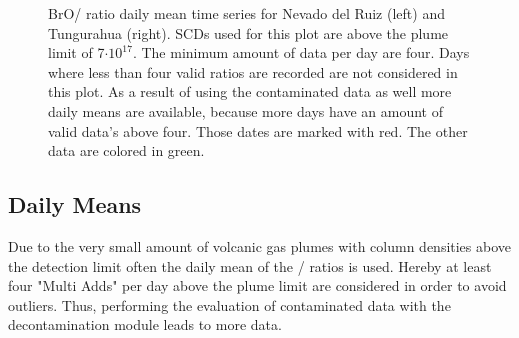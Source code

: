 \documentclass  [
  paper    = a4,
  BCOR     = 10mm,
  twoside,
  fontsize = 12pt,
  fleqn,
  toc      = bibnumbered,
  toc      = listofnumbered,
  numbers  = noendperiod,
  headings = normal,
  listof   = leveldown,
  version  = 3.03
]                                       {scrreprt}
\begin{document}
	\begin{figure}
		\caption[BrO/ ratio daily mean time series for Nevado del Ruiz (left) and Tungurahua (right).]{
			BrO/ ratio daily mean time series for Nevado del Ruiz (left) and Tungurahua (right).  SCDs used for this plot are above the plume limit of 7$\cdot 10^{17}$. The minimum amount of data per day are four. Days where less than four valid ratios are recorded are not considered in this plot. As a result of using the contaminated data as well more daily means are available, because more days have an amount of valid data's above four. Those dates are marked with red. The other data are colored in green.}
		\label{fig:dailymeanstungurahua}
	\end{figure}
	\subsection*{Daily Means}
	
	 Due to the very small amount of volcanic gas plumes with 
	  column densities above the detection limit often the daily mean of the /  ratios is used. Hereby at least four "Multi Adds" per day above the plume limit are considered in order to avoid outliers. Thus, performing the evaluation of contaminated data with the decontamination module leads to more data.\\
\end{document}
